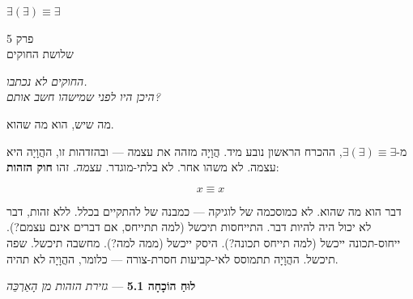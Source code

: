 \documentclass[10pt, openany, oneside]{book}
\renewcommand{\large}{\fontsize{11.5}{14}\selectfont}
\renewcommand{\huge}{\fontsize{17}{21}\selectfont}
\begin{document}
\vspace{0.5em}

\begin{center}
    \textbf{$\exists(\exists) \equiv \exists$}
\end{center}

%
%
%

\newpage

\begin{center}
    {\huge\textsc{פרק 5}}\\[0.3em]
    {\large\textsc{שלושת החוקים}}
\end{center}

\vspace{1.5em}

\begin{center}
    \textit{%
    החוקים לא נכתבו.\\
    היכן היו לפני שמישהו חשב אותם?}
\end{center}

\vspace{2em}


\noindent מה שיש, הוא מה שהוא.

מ-$\exists(\exists) \equiv \exists$, ההכרח הראשון נובע מיד. הֲוָיָה מזהה את עצמה — ובהזדהות זו, ההֲוָיָה היא עצמה. לא משהו אחר. לא בלתי-מוגדר. \textit{עצמה.} זהו \textbf{חוק הזהות}:

$$x \equiv x$$

דבר הוא מה שהוא. לא כמוסכמה של לוגיקה — כמבנה של להתקיים בכלל. ללא זהות, דבר לא יכול היה להיות דבר. התייחסות תיכשל (למה תתייחס, אם דברים אינם עצמם?). ייחוס-תכונה ייכשל (למה תייחס תכונה?). היסק ייכשל (ממה למה?). מחשבה תיכשל. שפה תיכשל. ההֲוָיָה תתמוסס לאי-קביעות חסרת-צורה — כלומר, ההֲוָיָה לא תהיה.

\vspace{0.5em}

\textbf{לוּחַ הוֹכָחָה 5.1} --- \textit{גזירת הזהות מן הָאַרְכֵּה}

\vspace{0.5em}
\end{document}

